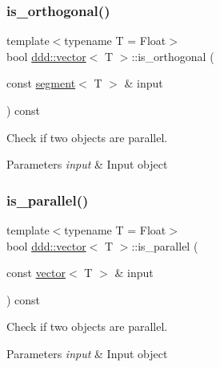 \subsubsection{\texorpdfstring{is\+\_\+orthogonal()}{is\_orthogonal()}\hspace{0.1cm}{\footnotesize\ttfamily [4/4]}}
{\footnotesize\ttfamily template$<$typename T = Float$>$ \\
bool \hyperlink{classddd_1_1vector}{ddd\+::vector}$<$ T $>$\+::is\+\_\+orthogonal (\begin{DoxyParamCaption}\item[{const \hyperlink{classddd_1_1segment}{segment}$<$ T $>$ \&}]{input }\end{DoxyParamCaption}) const\hspace{0.3cm}{\ttfamily [inline]}}



Check if two objects are parallel. 


\begin{DoxyParams}{Parameters}
{\em input} & Input object \\
\hline
\end{DoxyParams}
\mbox{\label{classddd_1_1vector_ac3fc063a06940c9893579b1f53f1dda0}} 
\subsubsection{\texorpdfstring{is\+\_\+parallel()}{is\_parallel()}\hspace{0.1cm}{\footnotesize\ttfamily [1/5]}}
{\footnotesize\ttfamily template$<$typename T = Float$>$ \\
bool \hyperlink{classddd_1_1vector}{ddd\+::vector}$<$ T $>$\+::is\+\_\+parallel (\begin{DoxyParamCaption}\item[{const \hyperlink{classddd_1_1vector}{vector}$<$ T $>$ \&}]{input }\end{DoxyParamCaption}) const\hspace{0.3cm}{\ttfamily [inline]}}



Check if two objects are parallel. 


\begin{DoxyParams}{Parameters}
{\em input} & Input object \\
\hline
\end{DoxyParams}
\mbox{\label{classddd_1_1vector_a9a7893c62abf786830e4809af056c041}} 
